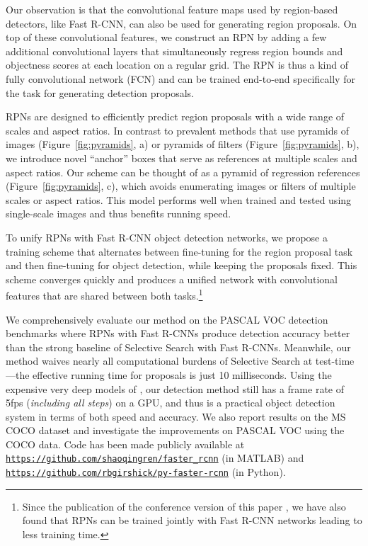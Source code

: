 \documentclass[10pt,journal,cspaper,compsoc]{IEEEtran}
\begin{document}
Our observation is that the convolutional feature maps used by region-based detectors, like Fast R-CNN, can also be used for generating region proposals.
On top of these convolutional features, we construct an RPN by adding a few additional convolutional layers that simultaneously regress region bounds and objectness scores at each location on a regular grid.
The RPN is thus a kind of fully convolutional network (FCN) \cite{Long2015} and can be trained end-to-end specifically for the task for generating detection proposals.

RPNs are designed to efficiently predict region proposals with a wide range of scales and aspect ratios. In contrast to prevalent methods \cite{Felzenszwalb2010,Sermanet2014,He2014,Girshick2015a} that use pyramids of images (Figure~\ref{fig:pyramids}, a) or pyramids of filters (Figure~\ref{fig:pyramids}, b), we introduce novel ``anchor'' boxes that serve as references at multiple scales and aspect ratios. Our scheme can be thought of as a pyramid of regression references (Figure~\ref{fig:pyramids}, c), which avoids enumerating images or filters of multiple scales or aspect ratios. This model performs well when trained and tested using single-scale images and thus benefits running speed.

To unify RPNs with Fast R-CNN \cite{Girshick2015a} object detection networks, we propose a training scheme that alternates between fine-tuning for the region proposal task and then fine-tuning for object detection, while keeping the proposals fixed.
This scheme converges quickly and produces a unified network with convolutional features that are shared between both tasks.\footnote{Since the publication of the conference version of this paper \cite{Ren2015a}, we have also found that RPNs can be trained jointly with Fast R-CNN networks leading to less training time.}

We comprehensively evaluate our method on the PASCAL VOC detection benchmarks \cite{Everingham2007} where RPNs with Fast R-CNNs produce detection accuracy better than the strong baseline of Selective Search with Fast R-CNNs. Meanwhile, our method waives nearly all computational burdens of Selective Search at test-time---the effective running time for proposals is just 10 milliseconds.
Using the expensive very deep models of \cite{Simonyan2015}, our detection method still has a frame rate of 5fps (\emph{including all steps}) on a GPU, and thus is a practical object detection system in terms of both speed and accuracy.
We also report results on the MS COCO dataset \cite{Lin2014} and investigate the improvements on PASCAL VOC using the COCO data.
Code has been made publicly available at \texttt{\url{https://github.com/shaoqingren/faster_rcnn}} (in MATLAB) and \texttt{\url{https://github.com/rbgirshick/py-faster-rcnn}} (in Python).
\end{document}
